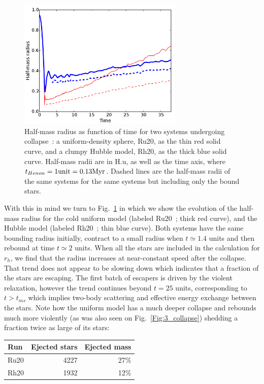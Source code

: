 \begin{figure}
\begin{center}
\includegraphics[width=0.7\textwidth]{Figures/3_Rhm_global}
\caption[Half-mass radius as function of time for both HL fragmented and uniform model]{Half-mass radius as function of time for two systems undergoing collapse~: a uniform-density sphere, Ru20, as the thin red solid curve, and a clumpy Hubble model, Rh20, as the thick blue solid curve. Half-mass radii are in H.u, as well as the time axis, where $t_{Henon} = 1 {\rm unit} =  0.13 {\textrm{Myr}}$. Dashed lines are the half-mass radii of the same systems for the same systems but including only the bound stars.}
\label{Fig:3_Rhm_global}
\end{center}
\end{figure}




With this in mind  we turn to Fig.~\ref{Fig:3_Rhm_global} in which we show the evolution of the half-mass radius for the cold uniform model (labeled Ru20~; thick red curve), and the Hubble model (labeled Rh20~; thin blue curve). Both systems have the same bounding radius initially, contract to a small radius when $t \simeq 1.4 $ units and then rebound at time $t \simeq 2 $ units. When all the stars are included in the calculation for $r_h$, we find that the radius increases at near-constant speed after the collapse. That trend does not appear to be slowing down which indicates that a fraction of the stars are escaping. The first batch of escapers is driven by the violent relaxation, however the trend continues beyond $ t = 25$ units, corresponding to $t > t_{ms}$ which implies two-body scattering and effective energy exchange between the stars. Note how the uniform model has a much deeper collapse and rebounds much more violently (as was also seen on Fig.~\ref{Fig:3_collapse}) shedding a fraction twice as large of its stars:
%
\begin{center}
\begin{tabular}{lrr}
Run & Ejected stars & Ejected mass  \\
\hline
Ru20  &  4227 & 27\% \\
Rh20  &  1932 & 12\% \\
\end{tabular}
\end{center}




